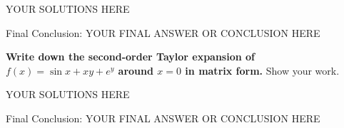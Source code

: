 \begin{solution}

YOUR SOLUTIONS HERE

{\color{red} Final Conclusion: YOUR FINAL ANSWER OR CONCLUSION HERE}

\end{solution}

\qpart{[5 points]}
\textbf{Write down the second-order Taylor expansion of $f(x) = \sin x+xy+e^y$ around $x=0$ in matrix form.} Show your work. 

\begin{solution}

YOUR SOLUTIONS HERE

{\color{red} Final Conclusion: YOUR FINAL ANSWER OR CONCLUSION HERE}

\end{solution}



